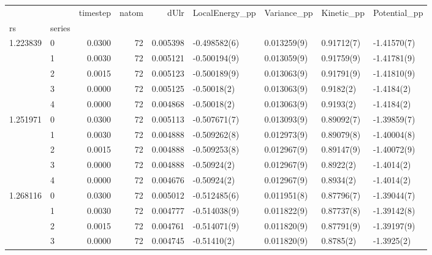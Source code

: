 \begin{tabular}{llrrrllll}
\toprule
         &   &  timestep &  natom &      dUlr & LocalEnergy\_pp &     Variance\_pp &     Kinetic\_pp &   Potential\_pp \\
rs & series &           &        &           &                &                 &                &                \\
\midrule
1.223839 & 0 &    0.0300 &     72 &  0.005398 &   -0.498582(6) &     0.013259(9) &     0.91712(7) &    -1.41570(7) \\
         & 1 &    0.0030 &     72 &  0.005121 &   -0.500194(9) &     0.013059(9) &     0.91759(9) &    -1.41781(9) \\
         & 2 &    0.0015 &     72 &  0.005123 &   -0.500189(9) &     0.013063(9) &     0.91791(9) &    -1.41810(9) \\
         & 3 &    0.0000 &     72 &  0.005125 &    -0.50018(2) &     0.013063(9) &      0.9182(2) &     -1.4184(2) \\
         & 4 &    0.0000 &     72 &  0.004868 &    -0.50018(2) &     0.013063(9) &      0.9193(2) &     -1.4184(2) \\
1.251971 & 0 &    0.0300 &     72 &  0.005113 &   -0.507671(7) &     0.013093(9) &     0.89092(7) &    -1.39859(7) \\
         & 1 &    0.0030 &     72 &  0.004888 &   -0.509262(8) &     0.012973(9) &     0.89079(8) &    -1.40004(8) \\
         & 2 &    0.0015 &     72 &  0.004888 &   -0.509253(8) &     0.012967(9) &     0.89147(9) &    -1.40072(9) \\
         & 3 &    0.0000 &     72 &  0.004888 &    -0.50924(2) &     0.012967(9) &      0.8922(2) &     -1.4014(2) \\
         & 4 &    0.0000 &     72 &  0.004676 &    -0.50924(2) &     0.012967(9) &      0.8934(2) &     -1.4014(2) \\
1.268116 & 0 &    0.0300 &     72 &  0.005012 &   -0.512485(6) &     0.011951(8) &     0.87796(7) &    -1.39044(7) \\
         & 1 &    0.0030 &     72 &  0.004777 &   -0.514038(9) &     0.011822(9) &     0.87737(8) &    -1.39142(8) \\
         & 2 &    0.0015 &     72 &  0.004761 &   -0.514071(9) &     0.011820(9) &     0.87791(9) &    -1.39197(9) \\
         & 3 &    0.0000 &     72 &  0.004745 &    -0.51410(2) &     0.011820(9) &      0.8785(2) &     -1.3925(2) \\

\end{tabular}
